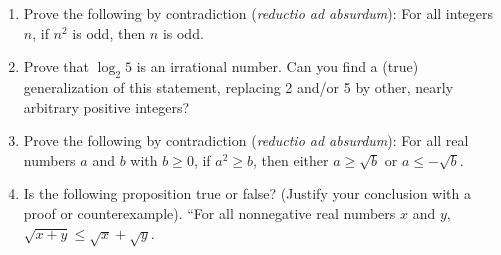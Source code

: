 \documentclass[12pt]{article}
\begin{document}
\begin{enumerate}
\item Prove the following by contradiction ({\it reductio ad absurdum}):\newline
     For all integers $n$, if $n^2$ is odd, then $n$ is odd. 

 \item Prove that $\log_2 5$ is an irrational number.\newline
     Can you find a (true) generalization of this statement, replacing 2 and/or 5 by other, nearly arbitrary positive integers?


\item Prove the following by contradiction ({\it reductio ad absurdum}):\newline
   For all real numbers $a$ and $b$ with $b\geq 0$, if $a^2\geq b$, then either $a\geq \sqrt{b}$ or $a\leq -\sqrt{b}$.


 \item Is the following proposition true or false?  (Justify your conclusion with a proof or counterexample).\newline
   ``For all nonnegative real numbers $x$ and $y$, $\sqrt{x+y}\leq\sqrt{x}+\sqrt{y}$.


\end{enumerate}
\end{document}
